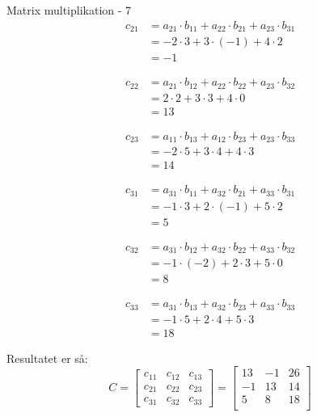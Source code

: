 \documentclass{article}
\begin{document}
\begin{exercise}{Matrix multiplikation - 7}
	\hint
	\begin{align*}
		c_{21} & = a_{21} \cdot b_{11} + a_{22} \cdot b_{21} + a_{23} \cdot b_{31} \\
		& = -2 \cdot 3 + 3 \cdot (-1) + 4 \cdot 2 \\
		& = -1
	\end{align*}
	
	\hint
	\begin{align*}
		c_{22} & = a_{21} \cdot b_{12} + a_{22} \cdot b_{22} + a_{23} \cdot b_{32}  \\
		& = 2 \cdot 2 + 3 \cdot 3 + 4 \cdot 0 \\
		& = 13
	\end{align*}
	
	\hint
	\begin{align*}
		c_{23} & = a_{11} \cdot b_{13} + a_{12} \cdot b_{23} + a_{23} \cdot b_{33}   \\
		& = -2 \cdot 5 + 3 \cdot 4 + 4 \cdot 3\\
		& = 14
	\end{align*}
	
	\hint
	\begin{align*}
		c_{31} & = a_{31} \cdot b_{11} + a_{32} \cdot b_{21} + a_{33} \cdot b_{31} \\
		& = -1 \cdot 3 + 2 \cdot (-1) + 5 \cdot 2 \\
		& = 5
	\end{align*}	
	
	\hint
	\begin{align*}
		c_{32} & = a_{31} \cdot b_{12} + a_{32} \cdot b_{22} + a_{33} \cdot b_{32}  \\
		& = -1 \cdot (-2) + 2 \cdot 3 + 5 \cdot 0 \\
		& = 8
	\end{align*}
	
	\hint
	\begin{align*}
		c_{33} & = a_{31} \cdot b_{13} + a_{32} \cdot b_{23} + a_{33} \cdot b_{33} \\
		& = -1 \cdot 5 + 2 \cdot 4 + 5 \cdot 3\\
		& = 18
	\end{align*}	
	
	
	
	\hint
	Resultatet er så:
	\[
	C = \left[\begin{array}{rrr}
	c_{11} & c_{12} & c_{13} \\
	c_{21} & c_{22} & c_{23} \\
	c_{31} & c_{32} & c_{33}
	\end{array} \right] = 
	\left[\begin{array}{rrr}
	13 & -1 & 26 \\
	-1 & 13 & 14 \\
	5 & 8 & 18 \\
	\end{array} \right]
	\]
	
	
\end{exercise}
\end{document}
